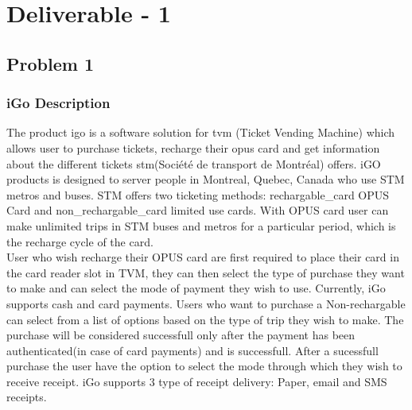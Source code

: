 \documentclass[a4paper,12pt]{report}
\begin{document}

\newpage

\tableofcontents




\chapter*{\centering Deliverable - 1}



%
%

\section{Problem 1}
\subsection{iGo Description}
The product \gls{igo} is a software solution for \gls{tvm} (Ticket Vending Machine) which allows user to purchase tickets, recharge their \gls{opus} card and get information about the different tickets \gls{stm}(Société de transport de Montréal)\cite{stmonline} offers. iGO products is designed to server people in Montreal, Quebec, Canada who use STM metros and buses. STM offers two ticketing methods: \gls{rechargable_card} OPUS Card and \gls{non_rechargable_card} limited use cards. With OPUS card user can make unlimited trips in STM buses and metros for a particular period, which is the recharge cycle of the card. \\


User who wish recharge their OPUS card are first required to place their card in the card reader slot in TVM, they can then select the type of purchase they want to make and can select the mode of payment they wish to use. Currently, iGo supports cash and card payments. Users who want to purchase a Non-rechargable can select from a list of options based on the type of trip they wish to make. The purchase will be considered successfull only after the payment has been authenticated(in case of card payments) and is successfull. After a sucessfull purchase the user have the option to select the mode through which they wish to receive receipt. iGo supports 3 type of receipt delivery: Paper, email and SMS receipts. \\
\end{document}
